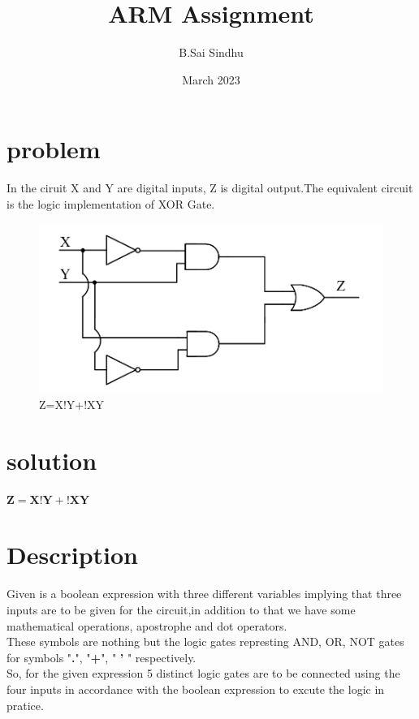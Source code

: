 \documentclass[10pt,twocolumn]{article}
\title{\textbf{ARM Assignment}}
\author{B.Sai Sindhu}
\date{March 2023}
\begin{document}
\maketitle
\section{problem}
In the ciruit X and Y are digital inputs, Z is digital output.The equivalent circuit is the logic implementation of XOR Gate.
\begin{figure}[h]
    \centering
    \includegraphics[scale=0.2]{xor.png}
    \caption{Z=X!Y+!XY}
    \label{fig:circuit}
\end{figure}

\section{solution}
    \begin{center}
    	${\boldsymbol{Z}=\boldsymbol{X}\boldsymbol{!Y}+\boldsymbol{!X}\boldsymbol{Y}}$
    \end{center}
    
\section{Description}
\large
Given is a boolean expression with three different variables implying that three inputs are to be given for the circuit,in addition to that we have some mathematical operations, apostrophe and dot operators. \vspace{2mm} 
\\ These symbols are nothing but the logic gates
represting AND, OR, NOT gates for symbols "\textbf{.}", "\textbf{+}", " \textbf{'} " respectively. \vspace{2mm}
\\ So, for the given expression 5 distinct logic gates are to be connected using the four inputs in accordance with the boolean expression to excute the logic in pratice.
\end{document}
